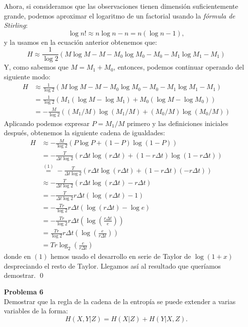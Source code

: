 \documentclass[a4paper]{article}
\newenvironment{problem}[2][Problema]
    { \begin{mdframed}[backgroundcolor=gray!20] \textbf{#1 #2} \\}
    {  \end{mdframed}}
\begin{document}
Ahora, si consideramos que las observaciones tienen dimensión suficientemente grande, podemos aproximar el logaritmo de un factorial usando la \emph{fórmula de Stirling}:
\[
\log n! \approx n \log n  - n = n(\log n - 1),
\]
y la usamos en la ecuación anterior obtenemos que:
\[
H \approx \frac{1}{\log 2} \left(M\log M - M - M_0\log M_0 - M_0 - M_1\log M_1 - M_1\right) 
\]
Y, como sabemos que \(M = M_1 + M_0\), entonces, podemos continuar operando del siguiente modo:
\begin{align*}
H &\approx \frac{1}{\log 2} \left(M\log M - M - M_0\log M_0 - M_0 - M_1\log M_1 - M_1\right) \\
& = \frac{1}{\log 2} \left(M_1(\log M - \log M_1) + M_0(\log M - \log M_0)\right)\\
& = -\frac{M}{\log 2} \left( (M_1/M)\log (M_1/M) + (M_0/M)\log(M_0/M)\right)
\end{align*}
Aplicando podemos expresar \(P = M_1/M\) primero y las definiciones iniciales después, obtenemos la siguiente cadena de igualdades:
\begin{align*}
H & \approx   -\frac{M}{\log 2} \left( P \log P + (1-P) \log(1-P) \right)\\
& = - \frac{T}{\Delta t \log 2} \left(r\Delta t \log (r\Delta t) + (1-r\Delta t)\log (1-r\Delta t) \right) \\
& \stackrel{(1)}{=} -\frac{T}{\Delta t \log 2} \left(r\Delta t \log (r\Delta t) + (1-r\Delta t)(-r\Delta t) \right)\\
& \approx -\frac{T}{\Delta t \log 2} \left(r\Delta t \log (r\Delta t) - r\Delta t \right) \\
& = - \frac{T}{\Delta t \log 2} r \Delta t \left(\log(r\Delta t) - 1\right)\\
& = - \frac{Tr}{ \log 2} r \Delta t \left(\log(r\Delta t) - \log e\right) \\
& = - \frac{Tr}{ \log 2} r \Delta t \left(\log \left( \frac{r\Delta t}{e}\right)\right)\\
& =  \frac{Tr}{ \log 2} r \Delta t \left(\log \left( \frac{e}{r\Delta t}\right)\right) \\
& = Tr \log_2\left( \frac{e}{r\Delta t}\right)
\end{align*}
donde en \((1)\) hemos usado el desarrollo en serie de Taylor de \( \log(1+x)\) despreciando el resto de Taylor. Llegamos así al resultado que queríamos demostrar. 
\qed

\begin{problem}{6}
Demostrar que la regla de la cadena de la entropía se puede extender a varias variables de la forma:
\[
H(X,Y|Z) = H(X|Z) +H(Y|X,Z).
\]
\end{problem}
\end{document}
